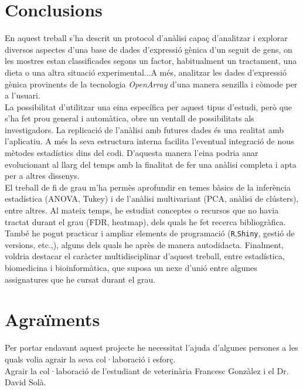 \documentclass[english]{article}
\begin{document}
\section{Conclusions}
En aquest treball s'ha descrit un protocol d'anàlisi capa\c{c} d'analitzar i explorar diversos aspectes d'una base de dades d'expressió gènica d'un seguit de gens, on les mostres estan classificades segons un factor, habitualment un tractament, una dieta o una altra situació experimental...A més, analitzar les dades d'expressió gènica provinents de la tecnologia \textit{OpenArray} d'una manera senzilla i còmode per a l'usuari.
\\

La possibilitat d'utilitzar una eina específica per aquest tipus d'estudi, però que s'ha fet prou general i automàtica, obre un ventall de possibilitats als investigadors. La replicació de l'anàlisi amb futures dades és una realitat amb l'aplicatiu. A més la seva estructura interna facilita l'eventual integració de nous mètodes estadístics dins del codi. D'aquesta manera l'eina podria anar evolucionant al llarg del temps amb la finalitat de fer una anàlisi completa i apta per a altres dissenys.
\\

El treball de fi de grau m'ha permès aprofundir en temes bàsics de la inferència estadística (ANOVA, Tukey) i de l'anàlisi multivariant (PCA, anàlisi de clústers), entre altres. Al mateix temps, he estudiat conceptes o recursos que no havia tractat durant el grau (FDR, heatmap), dels quals he fet recerca bibliogràfica. També he pogut practicar i ampliar elements de programació (\texttt{R},\texttt{Shiny}, gestió de versions, etc.,), alguns dels quals he après de manera autodidacta. Finalment, voldria destacar el caràcter multidisciplinar d'aquest treball, entre estadística, biomedicina i bioinformàtica, que suposa un nexe d'unió entre algunes assignatures que he cursat durant el grau.
\section{Agraïments}
\label{agr}
Per portar endavant aquest projecte he necessitat l'ajuda d'algunes persones a les quals volia agrair la seva col·laboració i esfor\c{c}.\\

Agrair la col·laboració de l'estudiant de veterinària Francesc Gonzàlez i el Dr. David Solà.\\
\end{document}
